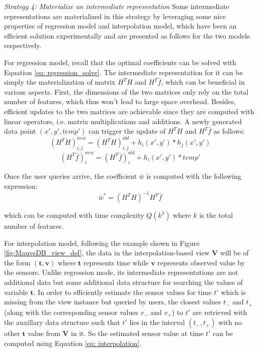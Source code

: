 \textit{Strategy 4: Materialize an intermediate representation}
Some intermediate representations are materialized in this strategy by leveraging some nice properties of regression model and interpolation model, which have been an efficient solution experimentally and are presented as follows for the two models respectively.

For regression model, recall that the optimal coefficients can be solved with Equation \ref{eq: regression_solve}. The intermediate representation for it can be simply the materialization of matrix $H^TH$ and $H^T\bar{f}$, which can be beneficial in various aspects. First, the dimensions of the two matrices only rely on the total number of features, which thus won't lead to large space overhead. Besides, efficient updates to the two matrices are achievable since they are computed with linear operators, i.e. matrix multiplications and additions. A newly generated data point $(x',y', temp')$ can trigger the update of $H^TH$ and $H^T\bar{f}$ as follows:
\begin{equation}
    (H^TH)^{new}_{i,j} = (H^TH)^{old}_{i,j} + h_i(x',y')*h_j(x',y')
\end{equation}
\begin{equation}
    (H^T\bar{f})^{new}_i = (H^T\bar{f})^{old}_i + h_i(x',y')*temp'
\end{equation}

Once the user queries arrive, the coefficient $\bar{w}$ is computed with the following expression:
\begin{equation}
    \bar{w}^*=(H^TH)^{-1}H^T\bar{f}
\end{equation}

which can be computed with time complexity $Q(k^3)$ where $k$ is the total number of features.

For interpolation model, following the example shown in Figure \ref{fig:MauveDB_view_def}, the data in the interpolation-based view $\textbf{V}$ will be of the form $(\textbf{t}, \textbf{v})$ where $\textbf{t}$ represents time while $\textbf{v}$ represents observed value by the sensors. Unlike regression mode, its intermediate representations are not additional data but some additional data structure for searching the values of variable $\textbf{t}$. In order to efficiently estimate the sensor values for time $t'$ which is missing from the view instance but queried by users, the closest values $t_{-}$ and $t_{+}$ (along with the corresponding sensor values $v_{-}$ and $v_{+}$) to $t'$ are retrieved with the auxillary data structure such that $t'$ lies in the interval $(t_{-}, t_{+})$ with no other $\textbf{t}$ value from $\textbf{V}$ in it. So the estimated sensor value at time $t'$ can be computed using Equation \ref{eq: interpolation}.

